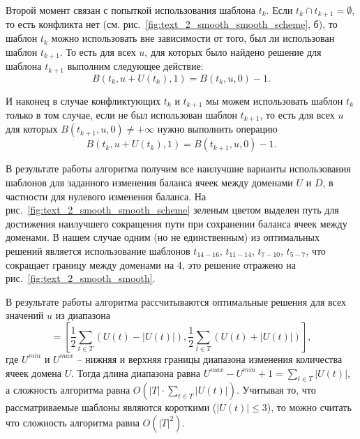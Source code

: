 Второй момент связан с попыткой использования шаблона $t_k$.
Если $t_k \cap t_{k + 1} = \emptyset$, то есть конфликта нет (см. рис.~\ref{fig:text_2_smooth_smooth_scheme}, б), то шаблон $t_k$ можно использовать вне зависимости от того, был ли использован шаблон $t_{k + 1}$.
То есть для всех $u$, для которых было найдено решение для шаблона $t_{k + 1}$ выполним следующее действие:
\begin{equation}
	B(t_k, u + U(t_k), 1) = B(t_k, u, 0) - 1.
\end{equation}

И наконец в случае конфликтующих $t_k$ и $t_{k + 1}$ мы можем использовать шаблон $t_k$ только в том случае, если не был использован шаблон $t_{k + 1}$, то есть для всех $u$ для которых $B(t_{k + 1}, u, 0) \ne +\infty$ нужно выполнить операцию
\begin{equation}
	B(t_k, u + U(t_k), 1) = B(t_{k + 1}, u, 0) - 1.
\end{equation}

В результате работы алгоритма получим все наилучшие варианты использования шаблонов для заданного изменения баланса ячеек между доменами $U$ и $D$, в частности для нулевого изменения баланса.
На рис.~\ref{fig:text_2_smooth_smooth_scheme} зеленым цветом выделен путь для достижения наилучшего сокращения пути при сохранении баланса ячеек между доменами.
В нашем случае одним (но не единственным) из оптимальных решений является использование шаблонов $t_{14-16}$, $t_{11-14}$, $t_{7-10}$, $t_{5-7}$, что сокращает границу между доменами на 4, это решение отражено на рис.~\ref{fig:text_2_smooth_smooth}.

В результате работы алгоритма рассчитываются оптимальные решения для всех значений $u$ из диапазона
\begin{equation}
	[U^{min}, U^{max}] = \left[ \frac{1}{2} \sum_{t \in T}{(U(t) - |U(t)|)}, \frac{1}{2} \sum_{t \in T}{(U(t) + |U(t)|)} \right],
\end{equation}
где $U^{min}$ и $U^{max}$ -- нижняя и верхняя границы диапазона изменения количества ячеек домена $U$.
Тогда длина диапазона равна $U^{max} - U^{min} + 1 = \sum_{t \in T}{|U(t)|}$, а сложность алгоритма равна $O \left( |T| \cdot \sum_{t \in T}{|U(t)|} \right)$.
Учитывая то, что рассматриваемые шаблоны являются короткими ($|U(t)| \le 3$), то можно считать что сложность алгоритма равна $O(|T|^2)$.

